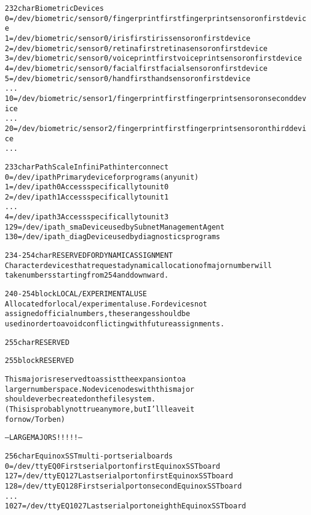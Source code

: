 \documentclass[a4paper,8pt,english]{sphinxmanual}
\begin{document}
\begin{alltt}
 232 char       Biometric Devices
                0 = /dev/biometric/sensor0/fingerprint  first fingerprint sensor on first device
                1 = /dev/biometric/sensor0/iris         first iris sensor on first device
                2 = /dev/biometric/sensor0/retina       first retina sensor on first device
                3 = /dev/biometric/sensor0/voiceprint   first voiceprint sensor on first device
                4 = /dev/biometric/sensor0/facial       first facial sensor on first device
                5 = /dev/biometric/sensor0/hand         first hand sensor on first device
                  ...
                10 = /dev/biometric/sensor1/fingerprint first fingerprint sensor on second device
                  ...
                20 = /dev/biometric/sensor2/fingerprint first fingerprint sensor on third device
                  ...

 233 char       PathScale InfiniPath interconnect
                0 = /dev/ipath        Primary device for programs (any unit)
                1 = /dev/ipath0       Access specifically to unit 0
                2 = /dev/ipath1       Access specifically to unit 1
                  ...
                4 = /dev/ipath3       Access specifically to unit 3
                129 = /dev/ipath\_sma    Device used by Subnet Management Agent
                130 = /dev/ipath\_diag   Device used by diagnostics programs

 234-254        char    RESERVED FOR DYNAMIC ASSIGNMENT
                Character devices that request a dynamic allocation of major number will
                take numbers starting from 254 and downward.

 240-254 block  LOCAL/EXPERIMENTAL USE
                Allocated for local/experimental use.  For devices not
                assigned official numbers, these ranges should be
                used in order to avoid conflicting with future assignments.

 255 char       RESERVED

 255 block      RESERVED

                This major is reserved to assist the expansion to a
                larger number space.  No device nodes with this major
                should ever be created on the filesystem.
                (This is probably not true anymore, but I'll leave it
                for now /Torben)

 ---LARGE MAJORS!!!!!---

 256 char       Equinox SST multi-port serial boards
                   0 = /dev/ttyEQ0      First serial port on first Equinox SST board
                 127 = /dev/ttyEQ127    Last serial port on first Equinox SST board
                 128 = /dev/ttyEQ128    First serial port on second Equinox SST board
                  ...
                1027 = /dev/ttyEQ1027   Last serial port on eighth Equinox SST board


\end{alltt}
\end{document}

